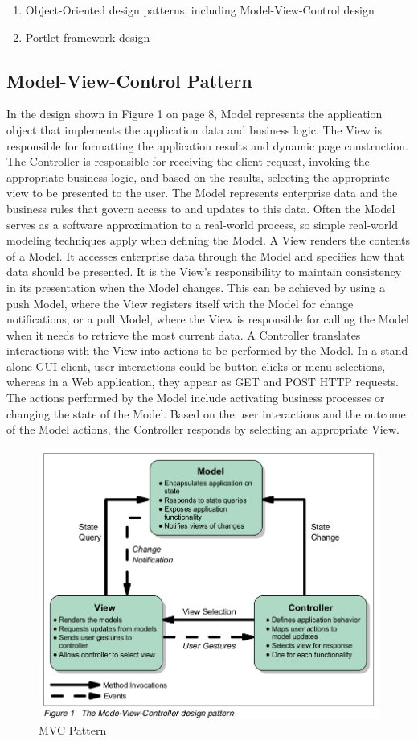 \begin{enumerate}
\item Object-Oriented design patterns, including Model-View-Control design
\item Portlet framework design
\end{enumerate}
\subsection{Model-View-Control Pattern}
In the design shown in Figure 1 on page 8, Model represents the application
object that implements the application data and business logic. The View is
responsible for formatting the application results and dynamic page construction.
The Controller is responsible for receiving the client request, invoking the
appropriate business logic, and based on the results, selecting the appropriate
view to be presented to the user.
The Model represents enterprise data and the business rules that govern
access to and updates to this data. Often the Model serves as a software
approximation to a real-world process, so simple real-world modeling
techniques apply when defining the Model.
A View renders the contents of a Model. It accesses enterprise data through
the Model and specifies how that data should be presented.
It is the View's responsibility to maintain consistency in its presentation when
the Model changes. This can be achieved by using a push Model, where the
View registers itself with the Model for change notifications, or a pull Model,
where the View is responsible for calling the Model when it needs to retrieve
the most current data.
A Controller translates interactions with the View into actions to be performed
by the Model. In a stand-alone GUI client, user interactions could be button
clicks or menu selections, whereas in a Web application, they appear as GET
and POST HTTP requests. The actions performed by the Model include
activating business processes or changing the state of the Model. Based on
the user interactions and the outcome of the Model actions, the Controller
responds by selecting an appropriate View.
\begin{figure}[!ht]
\centering
\includegraphics[scale=0.7]{images/MVCPattern.png}   
\caption[MVC Pattern]{MVC Pattern}
\label{img:MVCPattern}                           
\end{figure}
